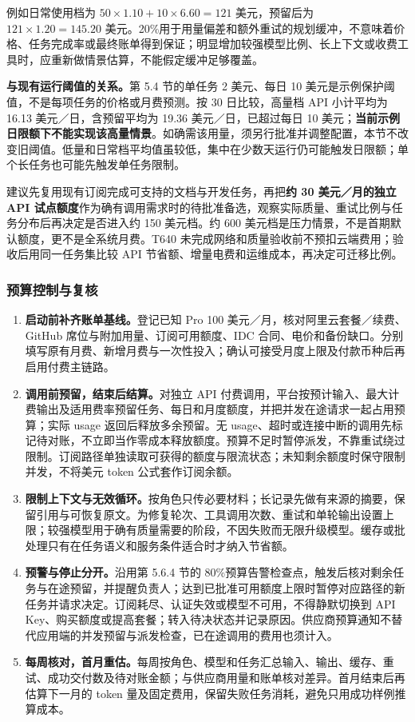 \documentclass[11pt,a4paper]{article}
\begin{document}
例如日常使用档为 $50\times1.10+10\times6.60=121$ 美元，预留后为 $121\times1.20=145.20$ 美元。20\%用于用量偏差和额外重试的规划缓冲，不意味着价格、任务完成率或最终账单得到保证；明显增加较强模型比例、长上下文或收费工具时，应重新做情景估算，不能假定缓冲足够覆盖。

\textbf{与现有运行阈值的关系。}第 5.4 节的单任务 2 美元、每日 10 美元是示例保护阈值，不是每项任务的价格或月费预测。按 30 日比较，高量档 API 小计平均为 16.13 美元／日，含预留平均为 19.36 美元／日，已超过每日 10 美元；\textbf{当前示例日限额下不能实现该高量情景}。如确需该用量，须另行批准并调整配置，本节不改变旧阈值。低量和日常档平均值虽较低，集中在少数天运行仍可能触发日限额；单个长任务也可能先触发单任务限制。

建议先复用现有订阅完成可支持的文档与开发任务，再把\textbf{约 30 美元／月的独立 API 试点额度}作为确有调用需求时的待批准备选，观察实际质量、重试比例与任务分布后再决定是否进入约 150 美元档。约 600 美元档是压力情景，不是首期默认额度，更不是全系统月费。T640 未完成网络和质量验收前不预扣云端费用；验收后用同一任务集比较 API 节省额、增量电费和运维成本，再决定可迁移比例。

\subsubsection{预算控制与复核}

\begin{enumerate}[leftmargin=2em,itemsep=4pt]
  \item \textbf{启动前补齐账单基线。}登记已知 Pro 100 美元／月，核对阿里云套餐／续费、GitHub 席位与附加用量、订阅可用额度、IDC 合同、电价和备份缺口。分别填写原有月费、新增月费与一次性投入；确认可接受月度上限及付款币种后再启用付费主链路。
  \item \textbf{调用前预留，结束后结算。}对独立 API 付费调用，平台按预计输入、最大计费输出及适用费率预留任务、每日和月度额度，并把并发在途请求一起占用预算；实际 usage 返回后释放多余预留。无 usage、超时或连接中断的调用先标记待对账，不立即当作零成本释放额度。预算不足时暂停派发，不靠重试绕过限制。订阅路径单独读取可获得的额度与限流状态；未知剩余额度时保守限制并发，不将美元 token 公式套作订阅余额。
  \item \textbf{限制上下文与无效循环。}按角色只传必要材料；长记录先做有来源的摘要，保留引用与可恢复原文。为修复轮次、工具调用次数、重试和单轮输出设置上限；较强模型用于确有质量需要的阶段，不因失败而无限升级模型。缓存或批处理只有在任务语义和服务条件适合时才纳入节省额。
  \item \textbf{预警与停止分开。}沿用第 5.6.4 节的 80\%预算告警检查点，触发后核对剩余任务与在途预留，并提醒负责人；达到已批准可用额度上限时暂停对应路径的新任务并请求决定。订阅耗尽、认证失效或模型不可用，不得静默切换到 API Key、购买额度或提高套餐；转入待决状态并记录原因。供应商预算通知不替代应用端的并发预留与派发检查，已在途调用的费用也须计入。
  \item \textbf{每周核对，首月重估。}每周按角色、模型和任务汇总输入、输出、缓存、重试、成功交付数及待对账金额；与供应商用量和账单核对差异。首月结束后再估算下一月的 token 量及固定费用，保留失败任务消耗，避免只用成功样例推算成本。
\end{enumerate}
\end{document}
